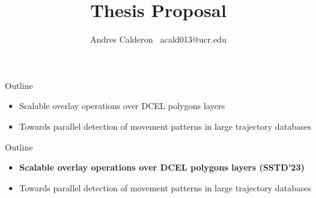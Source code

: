 \documentclass{beamer}
\title{Thesis Proposal}
\subtitle{}
\author{
    Andres Calderon \textperiodcentered \ acald013@ucr.edu \\
}
\institute{University of California, Riverside}
\begin{document}
    \begin{frame}
        \maketitle
    \end{frame}

    \begin{frame}{Outline}
        \begin{itemize}
                \item Scalable overlay operations over DCEL polygons layers
                \item Towards parallel detection of movement patterns in large trajectory databases
        \end{itemize}
    \end{frame}

    \begin{frame}{Outline}
        \begin{itemize}
                \item \textbf{Scalable overlay operations over DCEL polygons layers (SSTD'23)}
                \item Towards parallel detection of movement patterns in large trajectory databases
        \end{itemize}
    \end{frame}
\end{document}
